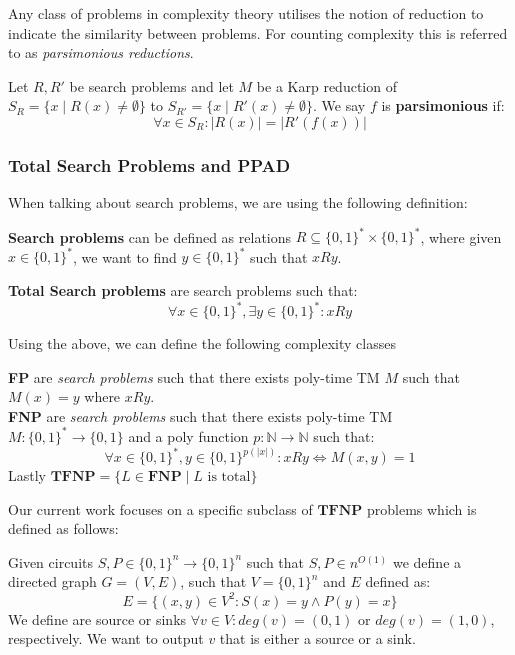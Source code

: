 Any class of problems in complexity theory utilises the notion of reduction
to indicate the similarity between problems. For counting complexity
this is referred to as \textit{parsimonious reductions}.


\begin{definition}
    Let $R, R'$ be search problems and let $M$ be a Karp reduction of
    $S_R = \{x \mid R(x) \neq \emptyset \}$ to $S_{R'} = \{x \mid R'(x) \neq \emptyset \}$.
    We say $f$ is \textbf{parsimonious} if:
    $$
    \forall x \in S_R : |R(x)| = |R'(f(x))|
    $$ 
\end{definition}

\subsubsection{Total Search Problems and PPAD}
When talking about search problems, we are using the following definition:

\begin{definition}
    \textbf{Search problems} can be defined as relations $R \subseteq \{0,1\}^* \times \{0,1\}^*$,
    where given $x \in \{0,1\}^*$, we want to find $y \in \{0,1\}^*$  such that $x Ry$.

    \textbf{Total Search problems} are search problems such that:
    $$
    \forall x \in \{0,1\}^*, \exists y \in \{0,1\}^* : xRy
    $$
\end{definition}

Using the above, we can define the following complexity classes

\begin{definition}
    \textbf{FP} are \textit{search problems} such that there exists poly-time TM $M$
    such that $M(x) = y$ where $x Ry$.\\
    \textbf{FNP} are \textit{search problems} such that there exists poly-time TM $M: \{0,1\}^* \to \{0,1\}$
    and a poly function $p : \mathbb{N} \to \mathbb{N}$ such that:
    $$
    \forall x \in \{0,1\}^*, y \in \{0,1\}^{p(|x|)}: xRy \iff M(x,y) = 1
    $$
    Lastly $\textbf{TFNP} = \{L \in \textbf{FNP} \mid L \text{ is total}\}$
\end{definition}

Our current work focuses on a specific subclass of $\textbf{TFNP}$ problems
which is defined as follows:

\begin{definition}
    Given circuits $S, P \in \{0,1\}^n \to \{0,1\}^n$ such that $S,P \in n^{O(1)}$
    we define a directed graph $G = (V,E)$, such that $V= \{0,1\}^n$ and $E$ defined as:
    $$
    E = \{(x,y) \in V^2: S(x) = y \wedge P(y) = x\}
    $$
    We define are source or sinks $\forall v \in V: \textit{deg}(v) = (0,1)$ or
    $\textit{deg}(v) = (1,0)$, respectively. We want to output
    $v$ that is either a source or a sink.
\end{definition}


